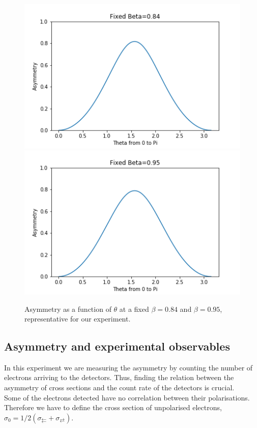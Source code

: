 \documentclass[10pt,swedish, openany]{book}
\begin{document}
\begin{figure}[H]
\includegraphics[scale=0.5]{Asymmetry_vs_Theta_84.png}
\includegraphics[scale=0.5]{Asymmetry_vs_Theta_95.png}
\centering
\caption{Asymmetry as a function of $\theta$ at a fixed $\beta=0.84$ and $\beta=0.95$, representative for our experiment.}
\label{fig:AsymmetryVsTheta}
\end{figure}

\subsection{Asymmetry and experimental observables}
\label{asym_measurement}

In this experiment we are measuring the asymmetry by counting the number of electrons arriving to the detectors. Thus, finding the relation between the asymmetry of cross sections and the count rate of the detectors is crucial.\\

Some of the electrons detected have no correlation between their polarisations. Therefore we have to define the cross section of unpolarised electrons, $\sigma_0 = 1/2 (\sigma_{\leftleftarrows} + \sigma_{\rightleftarrows})$.\\
\end{document}
